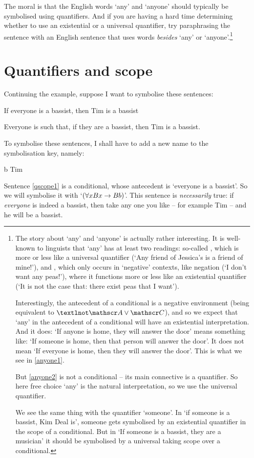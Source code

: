 The moral is that the English words `any' and `anyone' should typically be symbolised using quantifiers. And if you are having a hard time determining whether to use an existential or a universal quantifier, try paraphrasing the sentence with an English sentence that uses words \emph{besides} `any' or `anyone'.\footnote{The story about `any' and `anyone' is actually rather interesting. It is well-known to linguists that `any' has at least two readings: so-called , which is more or less like a universal quantifier (`Any friend of Jessica's is a friend of mine!'), and , which only occurs in `negative' contexts, like negation (`I don't want any peas!'), where it functions more or less like an existential quantifier (`It is not the case that: there exist peas that I want'). 

		Interestingly, the antecedent of a conditional is a negative environment (being equivalent to $¬\meta{A}\vee\meta{C}$), and so we expect that `any' in the antecedent of a conditional will have an existential interpretation. And it does: `If anyone is home, they will answer the door' means something like: `If someone is home, then that person will answer the door'. It does not mean `If everyone is home, then they will answer the door'. This is what we see in \ref{anyone1}.

		But \ref{anyone2} is not a conditional – its main connective is a quantifier. So here free choice `any' is the natural interpretation, so we use the universal quantifier.

		We see the same thing with the quantifier `someone'. In `if someone is a bassist, Kim Deal is', someone gets symbolised by an existential quantifier in the scope of a conditional. But in `If someone is a bassist, they are a musician' it should be symbolised by a universal taking scope over a conditional.}


\section{Quantifiers and scope}\label{s.quantifier.scope}
Continuing the example, suppose I want to symbolise these sentences:
	\begin{earg}
		\item[\ex{qscope1}] If everyone is a bassist, then Tim is a bassist
		\item[\ex{qscope2}] Everyone is such that, if they are a bassist, then Tim is a bassist.
	\end{earg}
To symbolise these sentences, I shall have to add a new name to the symbolisation key, namely:
	\begin{ekey}
		\item[b] Tim
	\end{ekey}
Sentence \ref{qscope1} is a conditional, whose antecedent is `everyone is a bassist'. So we will symbolise it with `$(\forall x Bx \rightarrow Bb)$'. This sentence is \emph{necessarily} true: if \emph{everyone} is indeed a bassist, then take any one you like – for example Tim – and he will be a bassist. 

